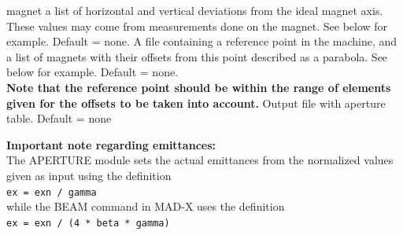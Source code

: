 \begin{madlist}
     magnet a list of horizontal and vertical deviations from the ideal
     magnet axis. These values may come from measurements done on the
     magnet. See below for example. Default = none.  
    A file containing a reference point in the machine,
     and a list of magnets with their offsets from this point described
     as a parabola. See below for example. Default = none. \\
     {\bf Note that the reference point should be within the range of
       elements given for the offsets to be taken into account.}
    Output file with aperture table. Default = none 
\end{madlist}


{\bf Important note regarding emittances:}\\
The APERTURE module sets the actual emittances from the normalized values
given as input using the definition\\
{\tt ex = exn / gamma}\\
while the BEAM command in MAD-X uses the definition\\
{\tt ex = exn / (4 * beta * gamma)}


